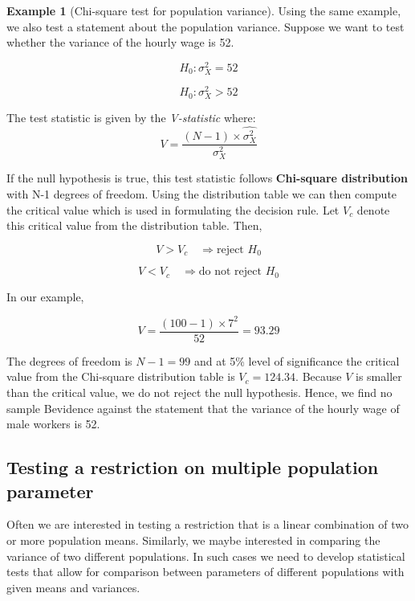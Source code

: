 \documentclass[
]{book}
\theoremstyle{definition}
\theoremstyle{definition}
\newtheorem{example}{Example}[chapter]
\theoremstyle{definition}
\theoremstyle{definition}
\theoremstyle{remark}
\begin{document}
\begin{example}[Chi-square test for population variance]
\protect\hypertarget{exm:unnamed-chunk-94}{}\label{exm:unnamed-chunk-94}Using the same example, we also test a statement about the population variance. Suppose we want to test whether the variance of the hourly wage is 52.

\[H_0: \sigma^2_X=52\]

\[H_0: \sigma^2_X >52 \]

The test statistic is given by the \emph{V-statistic} where:
\[V=\frac{(N-1)\times \hat{\sigma^2_X}}{\sigma^2_X}\]

If the null hypothesis is true, this test statistic follows \textbf{Chi-square distribution} with N-1 degrees of freedom. Using the distribution table we can then compute the critical value which is used in formulating the decision rule. Let \(V_c\) denote this critical value from the distribution table. Then,

\[V>V_c \quad \Rightarrow  \text{reject $H_0$} \]

\[V<V_c \quad \Rightarrow  \text{do not reject $H_0$} \]

In our example,

\[V=\frac{(100-1)\times 7^2}{52}=93.29\]

The degrees of freedom is \(N-1=99\) and at 5\% level of significance the critical value from the Chi-square distribution table is \(V_c=124.34\). Because \(V\) is smaller than the critical value, we do not reject the null hypothesis. Hence, we find no sample Bevidence against the statement that the variance of the hourly wage of male workers is 52.
\end{example}

\hypertarget{testing-a-restriction-on-multiple-population-parameter}{%
\subsection{Testing a restriction on multiple population parameter}\label{testing-a-restriction-on-multiple-population-parameter}}

Often we are interested in testing a restriction that is a linear combination of two or more population means. Similarly, we maybe interested in comparing the variance of two different populations. In such cases we need to develop statistical tests that allow for comparison between parameters of different populations with given means and variances.
\end{document}
